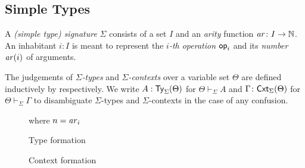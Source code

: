 \documentclass[acmsmall]{acmart}
\theoremstyle{acmdefinition}
\begin{document}
\subsection{Simple Types}
\begin{definition}
  A \emph{(simple type) signature} $\Sigma$ consists of a set $I$ and an \emph{arity} function $\mathit{ar}\colon I \to \mathbb{N}$.
  An inhabitant $i : I$ is meant to represent the \emph{$i$-th operation} $\mathsf{op}_i$ and its \emph{number} $ \mathit{ar}(i)$ of arguments.

  The judgements of \emph{$\Sigma$-types} and \emph{$\Sigma$-contexts} over a variable set $\Theta$ are defined inductively by  respectively.
We write $A : \mathsf{Ty}_{\Sigma}(\Theta)$ for $\Theta \vdash_{\Sigma} A$ and $\Gamma \colon \mathsf{Cxt}_{\Sigma}(\Theta)$ for $\Theta \vdash_{\Sigma} \Gamma$ to disambiguate $\Sigma$-types and $\Sigma$-contexts in the case of any confusion.
\end{definition}

\begin{figure}
  \begin{minipage}[b]{.55\textwidth}
    \centering
    \small
    where $n = \mathit{ar}_i$
    \caption{Type formation}
    \label{fig:simple-type}
  \end{minipage}
  \begin{minipage}[b]{.4\textwidth}
    \centering
    \small
    \caption{Context formation}
  \label{fig:simple-context}
  \end{minipage}
\end{figure}
\end{document}
